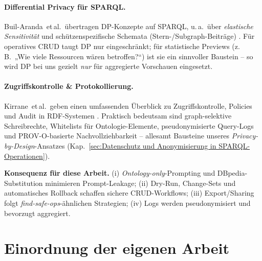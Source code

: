 \paragraph{Differential Privacy für SPARQL.}
Buil-Aranda~et\,al.\ übertragen DP-Konzepte auf SPARQL, u.\,a.\ über \emph{elastische Sensitivität} und schützenspezifische Schemata (Stern-/Subgraph-Beiträge) \cite{buil_aranda_dp_sparql}. Für operatives CRUD taugt DP nur eingeschränkt; für statistische Previews (z.\,B.\ „Wie viele Ressourcen wären betroffen?“) ist sie ein sinnvoller Baustein -- so wird DP bei uns gezielt \emph{nur} für aggregierte Vorschauen eingesetzt.

\paragraph{Zugriffskontrolle \& Protokollierung.}
Kirrane~et\,al.\ geben einen umfassenden Überblick zu Zugriffskontrolle, Policies und Audit in RDF-Systemen \cite{kirrane2018access_control_rdf_survey}. Praktisch bedeutsam sind graph-selektive Schreibrechte, Whitelists für Ontologie-Elemente, pseudonymisierte Query-Logs und PROV-O-basierte Nachvollziehbarkeit -- allesamt Bausteine unseres \emph{Privacy-by-Design}-Ansatzes (Kap.~\ref{sec:Datenschutz und Anonymisierung in SPARQL-Operationen}).

\medskip
\noindent\textbf{Konsequenz für diese Arbeit.} (i) \emph{Ontology-only}-Prompting und DBpedia-Substitution minimieren Prompt-Leakage; (ii) Dry-Run, Change-Sets und automatisches Rollback schaffen sichere CRUD-Workflows; (iii) Export/Sharing folgt \emph{find-safe-ops}-ähnlichen Strategien; (iv) Logs werden pseudonymisiert und bevorzugt aggregiert.

\section{Einordnung der eigenen Arbeit}
\label{sec:rw-positionierung}

